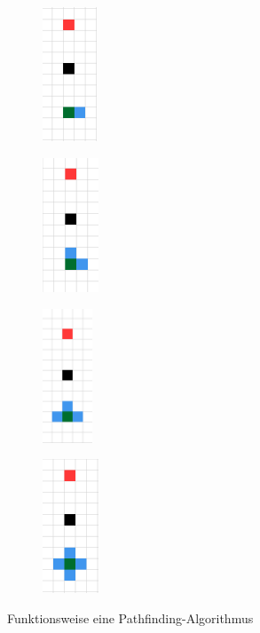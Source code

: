 {{{{			\begin{figure}[H]
				\captionsetup{width=.8\linewidth}
				\centering
				\begin{subfigure}[h]{.17\linewidth}
					\centering
					\includegraphics[scale=0.6, height =4cm]{Bilder/pathfinding_procedure_1.png}
					\label{pic:pathproc1}
				\end{subfigure}%
				\qquad %
				\begin{subfigure}[h]{.17\linewidth}
					\centering
					\includegraphics[scale=0.6, height =4cm]{Bilder/pathfinding_procedure_2.png}
					\label{pic:pathpro2}
				\end{subfigure}%
				\qquad
				\begin{subfigure}[h]{.17\linewidth}
					\centering
					\includegraphics[scale=0.6, height =4cm]{Bilder/pathfinding_procedure_3.png}
					\label{pic:pathproc3}
				\end{subfigure}%
				\qquad %
				\begin{subfigure}[h]{.17\linewidth}
					\centering
					\includegraphics[scale=0.6, height =4cm]{Bilder/pathfinding_procedure_4.png}
					\label{pic:pathproc4}
				\end{subfigure}%
				\caption{Funktionsweise eine Pathfinding-Algorithmus}
				\label{pic:pathproc}
			\end{figure}
			
}}}}

